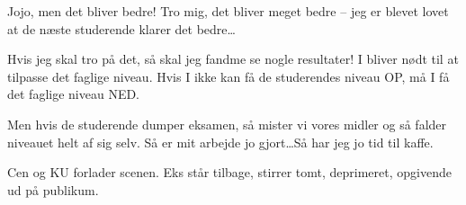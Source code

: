\documentclass[a4paper,11pt]{article}
\begin{document}
\begin{sketch}
 Jojo, men det bliver bedre! Tro mig, det bliver meget bedre -- jeg er blevet lovet at de næste studerende klarer det bedre\ldots

 Hvis jeg skal tro på det, så skal jeg fandme se nogle resultater! I bliver nødt til at tilpasse det faglige niveau. Hvis I ikke kan få de studerendes niveau OP, må I få det faglige niveau NED. 

 Men hvis de studerende dumper eksamen, så mister vi vores midler og så falder niveauet helt af sig selv. Så er mit arbejde jo gjort\ldots Så har jeg jo tid til kaffe.

\scene Cen og KU forlader scenen. Eks står tilbage, stirrer tomt, deprimeret, opgivende ud på publikum.




\end{sketch}
\end{document}
